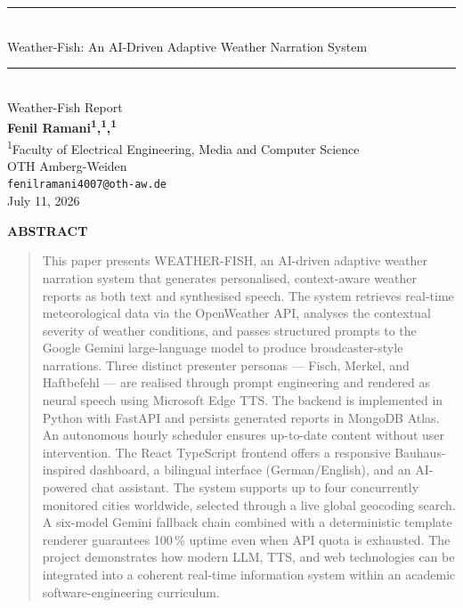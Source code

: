 \documentclass[11pt, a4paper]{article}
\renewenvironment{abstract}{%
  \small\begin{center}\textbf{A\footnotesize BSTRACT}\end{center}%
  \begin{quotation}
}{%
  \end{quotation}
}
\begin{document}
\begin{center}
  \rule{\linewidth}{1.5pt}\\[6pt]
  {\Large\sc Weather-Fish: An AI-Driven Adaptive Weather Narration System}\\[4pt]
  \rule{\linewidth}{0.6pt}\\[6pt]
  {\small\sc Weather-Fish Report}\\[12pt]

  \textbf{Fenil Ramani\textsuperscript{1},\textsuperscript{1},\textsuperscript{1}}\\[4pt]
  \textsuperscript{1}Faculty of Electrical Engineering, Media and Computer Science\\
  OTH Amberg-Weiden\\
  \texttt{fenilramani4007@oth-aw.de}\\[10pt]
  July 11, 2026
\end{center}

\vspace{8pt}

\begin{abstract}
This paper presents WEATHER-FISH, an AI-driven adaptive weather narration system that generates
personalised, context-aware weather reports as both text and synthesised speech. The system retrieves
real-time meteorological data via the OpenWeather API, analyses the contextual severity of weather
conditions, and passes structured prompts to the Google Gemini large-language model to produce
broadcaster-style narrations. Three distinct presenter personas — Fisch, Merkel, and Haftbefehl — are
realised through prompt engineering and rendered as neural speech using Microsoft Edge TTS. The
backend is implemented in Python with FastAPI and persists generated reports in MongoDB Atlas.
An autonomous hourly scheduler ensures up-to-date content without user intervention. The React
TypeScript frontend offers a responsive Bauhaus-inspired dashboard, a bilingual interface
(German/English), and an AI-powered chat assistant. The system supports up to four concurrently
monitored cities worldwide, selected through a live global geocoding search. A six-model Gemini
fallback chain combined with a deterministic template renderer guarantees 100\,\% uptime even when
API quota is exhausted. The project demonstrates how modern LLM, TTS, and web technologies
can be integrated into a coherent real-time information system within an academic software-engineering
curriculum.
\end{abstract}
\end{document}
